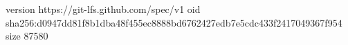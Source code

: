 version https://git-lfs.github.com/spec/v1
oid sha256:d0947dd81f8b1dba48f455ec8888bd6762427edb7e5cdc433f2417049367f954
size 87580
